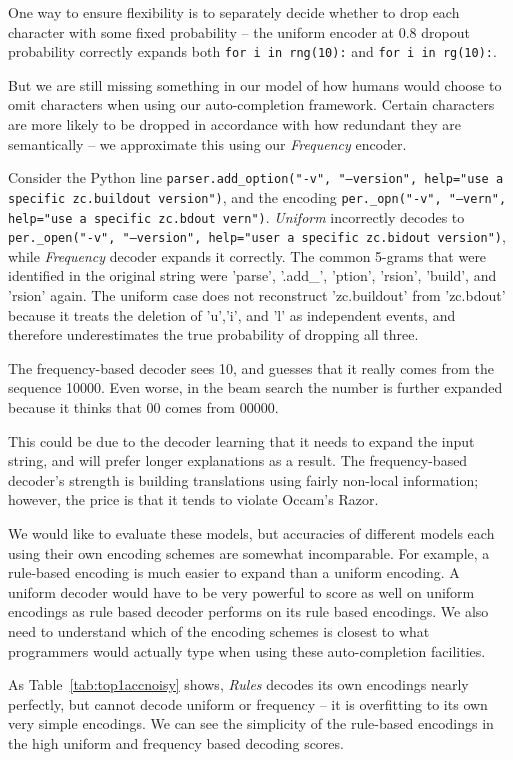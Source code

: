 \documentclass{article}
\begin{document}
One way to ensure flexibility is to separately decide whether to drop each character with some fixed probability -- the uniform encoder at 0.8 dropout probability correctly expands both \texttt{for i in rng(10):} and \texttt{for i in rg(10):}.

But we are still missing something in our model of how humans would choose to omit characters when using our auto-completion framework. Certain characters are more likely to be dropped in accordance with how redundant they are semantically -- we approximate this using our \emph{Frequency} encoder.

Consider the Python line \texttt{parser.add\_option("-v", "--version", help="use a specific zc.buildout version")}, and the encoding \texttt{per.\_opn("-v", "--vern", help="use a specific zc.bdout vern")}. \emph{Uniform} incorrectly decodes to \texttt{per.\_open("-v", "--version", help="user a specific zc.bidout version")}, while \emph{Frequency} decoder expands it correctly. The common 5-grams that were identified in the original string were 'parse', '.add\_', 'ption', 'rsion', 'build', and 'rsion' again. The uniform case does not reconstruct 'zc.buildout' from 'zc.bdout' because it treats the deletion of 'u','i', and 'l' as independent events, and therefore underestimates the true probability of dropping all three.

The frequency-based decoder sees 10, and guesses that it really comes from the sequence 10000. Even worse, in the beam search the number is further expanded because it thinks that 00 comes from 00000.

This could be due to the decoder learning that it needs to expand the input string, and will prefer longer explanations as a result. The frequency-based decoder's strength is building translations using fairly non-local information; however, the price is that it tends to violate Occam's Razor.

We would like to evaluate these models, but accuracies of different models each using their own encoding schemes are somewhat incomparable. For example, a rule-based encoding is much easier to expand than a uniform encoding. A uniform decoder would have to be very powerful to score as well on uniform encodings as rule based decoder performs on its rule based encodings. We also need to understand which of the encoding schemes is closest to what programmers would actually type when using these auto-completion facilities.

As Table~\ref{tab:top1accnoisy} shows, \emph{Rules} decodes its own encodings nearly perfectly, but cannot decode uniform or frequency -- it is overfitting to its own very simple encodings. We can see the simplicity of the rule-based encodings in the high uniform and frequency based decoding scores.
\end{document}
